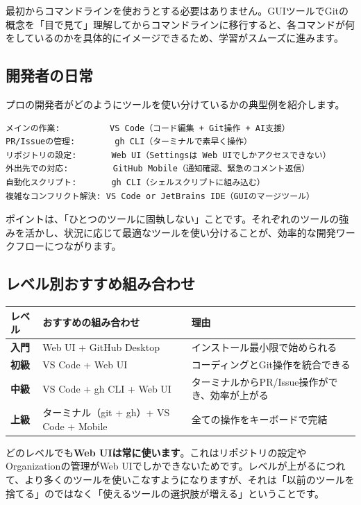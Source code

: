 最初からコマンドラインを使おうとする必要はありません。GUIツールでGitの概念を「目で見て」理解してからコマンドラインに移行すると、各コマンドが何をしているのかを具体的にイメージできるため、学習がスムーズに進みます。

\subsection{開発者の日常}

プロの開発者がどのようにツールを使い分けているかの典型例を紹介します。

\begin{lstlisting}[language={}]
メインの作業:          VS Code（コード編集 + Git操作 + AI支援）
PR/Issueの管理:        gh CLI（ターミナルで素早く操作）
リポジトリの設定:       Web UI（Settingsは Web UIでしかアクセスできない）
外出先での対応:         GitHub Mobile（通知確認、緊急のコメント返信）
自動化スクリプト:       gh CLI（シェルスクリプトに組み込む）
複雑なコンフリクト解決: VS Code or JetBrains IDE（GUIのマージツール）
\end{lstlisting}

ポイントは、「ひとつのツールに固執しない」ことです。それぞれのツールの強みを活かし、状況に応じて最適なツールを使い分けることが、効率的な開発ワークフローにつながります。

\subsection{レベル別おすすめ組み合わせ}

\begin{table}[h]
\centering
\begin{tabular}{lll}
\hline
レベル & おすすめの組み合わせ & 理由 \\
\hline
\textbf{入門} & Web UI + GitHub Desktop & インストール最小限で始められる \\
\textbf{初級} & VS Code + Web UI & コーディングとGit操作を統合できる \\
\textbf{中級} & VS Code + gh CLI + Web UI & ターミナルからPR/Issue操作ができ、効率が上がる \\
\textbf{上級} & ターミナル（git + gh）+ VS Code + Mobile & 全ての操作をキーボードで完結 \\
\hline
\end{tabular}
\end{table}

どのレベルでも\textbf{Web UIは常に使います}。これはリポジトリの設定やOrganizationの管理がWeb UIでしかできないためです。レベルが上がるにつれて、より多くのツールを使いこなすようになりますが、それは「以前のツールを捨てる」のではなく「使えるツールの選択肢が増える」ということです。

